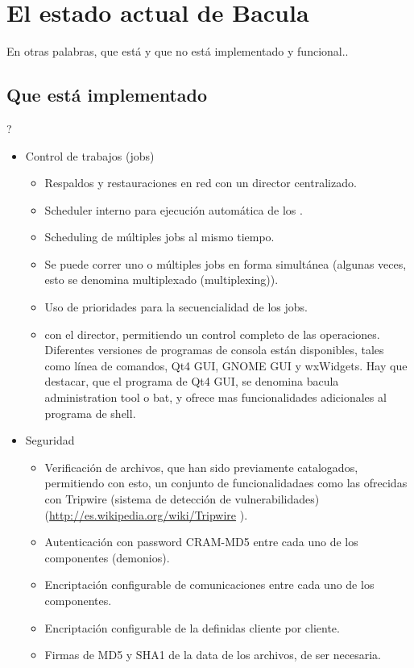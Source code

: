 
\chapter{El estado actual de Bacula}
\label{StateChapter}

En otras palabras, que está y que no está implementado y funcional..

\section{Que está implementado}?

\begin{itemize}
\item Control de trabajos (jobs) 

   \begin{itemize}
   \item Respaldos y restauraciones en red con un director centralizado.
   \item Scheduler interno para ejecución automática de los 
      .  
   \item Scheduling de múltiples jobs al mismo tiempo.  
   \item Se puede correr uno o múltiples jobs en forma simultánea 
         (algunas veces, esto se denomina multiplexado (multiplexing)).
   \item Uso de prioridades para la secuencialidad de los jobs.
   \item {} con el director, permitiendo un control completo
      de las operaciones. Diferentes versiones de programas de consola están disponibles,
      tales como línea de comandos, Qt4 GUI, GNOME GUI y wxWidgets. Hay que destacar, que
      el programa de Qt4 GUI, se denomina bacula administration tool o bat, y ofrece mas
      funcionalidades adicionales al programa de shell.
   \end{itemize}

\item Seguridad 
   \begin{itemize}
   \item Verificación de archivos, que han sido previamente catalogados, permitiendo con esto, 
      un conjunto de funcionalidadaes como las ofrecidas con Tripwire (sistema de detección
      de vulnerabilidades)(\url{http://es.wikipedia.org/wiki/Tripwire} ).  
   \item Autenticación con password CRAM-MD5 entre cada uno de los componentes (demonios).
   \item Encriptación configurable de comunicaciones 
       entre cada uno de los componentes.
   \item Encriptación configurable de la 
      definidas cliente por cliente.
   \item Firmas de MD5 y SHA1 de la data de los archivos, de ser necesaria.   
   \end{itemize}


\end{itemize}
